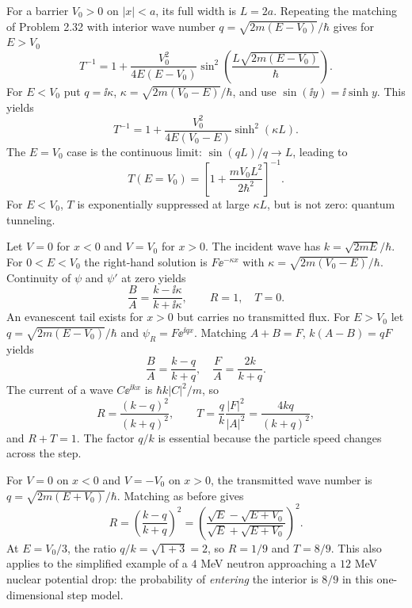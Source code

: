 For a barrier $V_0>0$ on $|x|<a$,
its full width is $L=2a$. Repeating the matching
of Problem 2.32 with interior wave number
$q=\sqrt{2m(E-V_0)}/\hbar$ gives for $E>V_0$
\begin{equation}
\boxed{T^{-1}=1+
\frac{V_0^2}{4E(E-V_0)}
\sin^2\left(\frac{L\sqrt{2m(E-V_0)}}{\hbar}\right)}.
\end{equation}
For $E<V_0$ put
$q=\ii\kappa$, $\kappa=\sqrt{2m(V_0-E)}/\hbar$,
and use $\sin(\ii y)=\ii\sinh y$. This yields
\begin{equation}
\boxed{T^{-1}=1+
\frac{V_0^2}{4E(V_0-E)}\sinh^2(\kappa L)}.
\end{equation}
The $E=V_0$ case is the continuous limit:
$\sin(qL)/q\to L$, leading to
\begin{equation}
\boxed{T(E=V_0)=\left[
1+\frac{mV_0 L^2}{2\hbar^2}\right]^{-1}}.
\end{equation}
For $E<V_0$, $T$ is exponentially suppressed at
large $\kappa L$, but is not zero: quantum tunneling.

Let $V=0$ for $x<0$ and $V=V_0$ for $x>0$.
The incident wave has $k=\sqrt{2mE}/\hbar$.
For $0<E<V_0$ the right-hand solution is
$F\ee^{-\kappa x}$ with
$\kappa=\sqrt{2m(V_0-E)}/\hbar$. Continuity of
$\psi$ and $\psi'$ at zero yields
\begin{equation}
\frac BA=\frac{k-\ii\kappa}{k+\ii\kappa},
\qquad \boxed{R=1,\quad T=0}.
\end{equation}
An evanescent tail exists for $x>0$ but carries no
transmitted flux. For $E>V_0$ let
$q=\sqrt{2m(E-V_0)}/\hbar$ and
$\psi_R=F\ee^{\ii qx}$.
Matching $A+B=F$, $k(A-B)=qF$ yields
\begin{equation}
\boxed{\frac BA=\frac{k-q}{k+q},
\quad \frac FA=\frac{2k}{k+q}}.
\end{equation}
The current of a wave $C\ee^{\ii kx}$ is
$\hbar k|C|^2/m$, so
\begin{equation}
\boxed{R=\frac{(k-q)^2}{(k+q)^2}},\qquad
\boxed{T=\frac qk\frac{|F|^2}{|A|^2}
=\frac{4kq}{(k+q)^2}},
\end{equation}
and $R+T=1$. The factor $q/k$ is essential
because the particle speed changes across the step.

For $V=0$ on $x<0$ and $V=-V_0$ on $x>0$,
the transmitted wave number is
$q=\sqrt{2m(E+V_0)}/\hbar$.
Matching as before gives
\begin{equation}
R=\left(\frac{k-q}{k+q}\right)^2
=\left(\frac{\sqrt E-\sqrt{E+V_0}}
{\sqrt E+\sqrt{E+V_0}}\right)^2 .
\end{equation}
At $E=V_0/3$, the ratio $q/k=\sqrt{1+3}=2$,
so $\boxed{R=1/9}$ and $\boxed{T=8/9}$.
This also applies to the simplified example of
a $4$ MeV neutron approaching a $12$ MeV nuclear
potential drop: the probability of
\emph{entering} the interior is $8/9$ in
this one-dimensional step model.
